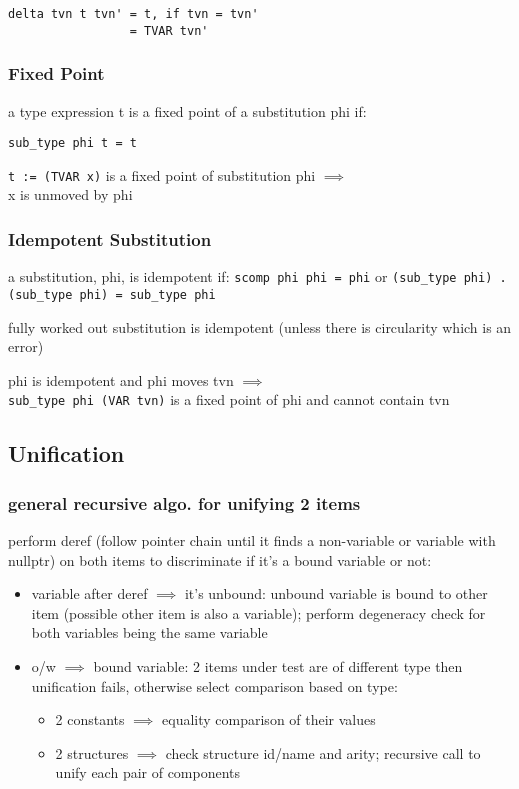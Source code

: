 \documentclass[8pt]{extarticle}
\begin{document}
\begin{multicols*}{2}
\begin{verbatim}
delta tvn t tvn' = t, if tvn = tvn'
                 = TVAR tvn'
\end{verbatim}

\subsubsection{Fixed Point}

a type expression t is a fixed point of a substitution phi if:
\begin{verbatim}
sub_type phi t = t
\end{verbatim}

\verb|t := (TVAR x)| is a fixed point of substitution phi $\implies$\\
x is unmoved by phi

\subsubsection{Idempotent Substitution}
a substitution, phi, is idempotent if:
\verb|scomp phi phi = phi| or 
\verb|(sub_type phi) . (sub_type phi) = sub_type phi|

fully worked out substitution is idempotent (unless there is circularity which is an error)

phi is idempotent and phi moves tvn $\implies$\\
\verb|sub_type phi (VAR tvn)| is a fixed point of phi and cannot contain tvn

\vfill\null
\columnbreak

\subsection{Unification}

\subsubsection{general recursive algo. for unifying 2 items}
perform deref (follow pointer chain until it finds a non-variable or variable with nullptr) on both items to discriminate if it's a bound variable or not:
\begin{itemize}
\item variable after deref $\implies$ it's unbound: unbound variable is bound to other item (possible other item is also a variable); perform degeneracy check for both variables being the same variable
\item o/w $\implies$ bound variable: 2 items under test are of different type then unification fails, otherwise select  comparison based on type:
  \begin{itemize}
    \item 2 constants $\implies$ equality comparison of their values
    \item 2 structures $\implies$ check structure id/name and arity; recursive call to unify each pair of components
  \end{itemize}
\end{itemize}


\end{multicols*}
\end{document}
